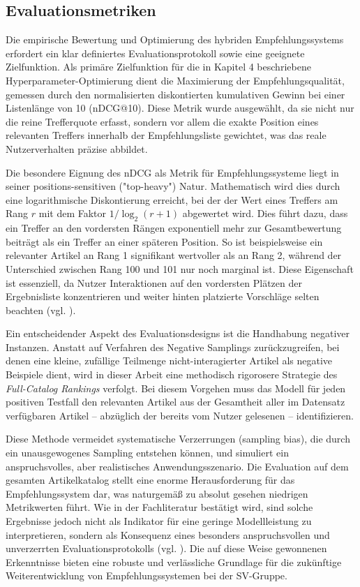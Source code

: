 \subsection{Evaluationsmetriken}
\label{sec:metrics}
Die empirische Bewertung und Optimierung des hybriden Empfehlungssystems erfordert ein klar definiertes 
Evaluationsprotokoll sowie eine geeignete Zielfunktion. Als primäre Zielfunktion für die in Kapitel 4 
beschriebene Hyperparameter-Optimierung dient die Maximierung der Empfehlungsqualität, gemessen durch 
den normalisierten diskontierten kumulativen Gewinn bei einer Listenlänge von 10 (nDCG@10). Diese Metrik 
wurde ausgewählt, da sie nicht nur die reine Trefferquote erfasst, sondern vor allem die exakte Position 
eines relevanten Treffers innerhalb der Empfehlungsliste gewichtet, was das reale Nutzerverhalten präzise abbildet.

Die besondere Eignung des nDCG als Metrik für Empfehlungssysteme liegt in seiner positions-sensitiven 
("top-heavy") Natur. Mathematisch wird dies durch eine logarithmische Diskontierung erreicht, bei der der 
Wert eines Treffers am Rang $r$ mit dem Faktor $1/\log_2(r+1)$ abgewertet wird. Dies führt dazu, dass ein 
Treffer an den vordersten Rängen exponentiell mehr zur Gesamtbewertung beiträgt als ein Treffer an einer 
späteren Position. So ist beispielsweise ein relevanter Artikel an Rang 1 signifikant wertvoller als 
an Rang 2, während der Unterschied zwischen Rang 100 und 101 nur noch marginal ist. Diese Eigenschaft ist 
essenziell, da Nutzer Interaktionen auf den vordersten Plätzen der Ergebnisliste konzentrieren und weiter 
hinten platzierte Vorschläge selten beachten (vgl. \cite{krichene_sampled_2020}).

Ein entscheidender Aspekt des Evaluationsdesigns ist die Handhabung negativer Instanzen. Anstatt auf 
Verfahren des Negative Samplings zurückzugreifen, bei denen eine kleine, zufällige Teilmenge 
nicht-interagierter Artikel als negative Beispiele dient, wird in dieser Arbeit eine 
methodisch rigorosere Strategie des \textit{Full-Catalog Rankings} verfolgt. Bei diesem Vorgehen muss 
das Modell für jeden positiven Testfall den relevanten Artikel aus der Gesamtheit aller im 
Datensatz verfügbaren Artikel – abzüglich der bereits vom Nutzer gelesenen – identifizieren.

Diese Methode vermeidet systematische Verzerrungen (sampling bias), die durch ein 
unausgewogenes Sampling entstehen können, und simuliert ein anspruchsvolles, aber realistisches 
Anwendungsszenario. Die Evaluation auf dem gesamten Artikelkatalog stellt eine enorme 
Herausforderung für das Empfehlungssystem dar, was naturgemäß zu absolut gesehen niedrigen 
Metrikwerten führt. Wie in der Fachliteratur bestätigt wird, sind solche Ergebnisse jedoch nicht 
als Indikator für eine geringe Modellleistung zu interpretieren, sondern als Konsequenz eines 
besonders anspruchsvollen und unverzerrten Evaluationsprotokolls 
(vgl. \cite{krichene_sampled_2020}). Die auf diese Weise gewonnenen Erkenntnisse bieten eine 
robuste und verlässliche Grundlage für die zukünftige Weiterentwicklung von 
Empfehlungssystemen bei der SV-Gruppe.

